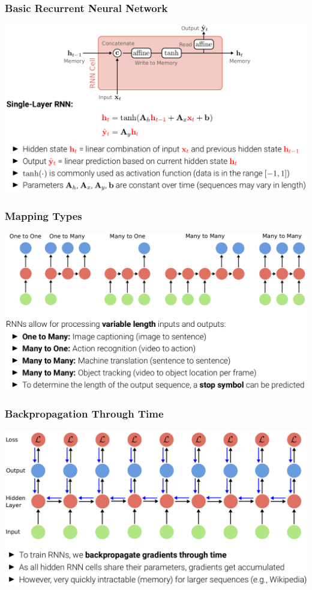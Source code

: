 \documentclass[10pt]{beamer}
\begin{document}
\begin{frame}
  \frametitle{Basic Recurrent Neural Network}
\begin{center}
\includegraphics[width=\textwidth]{images/s4}
\end{center}
\end{frame}


\begin{frame}
  \frametitle{Mapping Types}
\begin{center}
\includegraphics[width=\textwidth]{images/s5}
\end{center}
\end{frame}


\begin{frame}
  \frametitle{Backpropagation Through Time}
\begin{center}
\includegraphics[width=\textwidth]{images/s6}
\end{center}
\end{frame}
\end{document}
